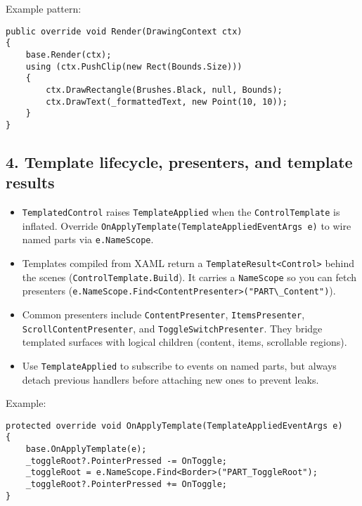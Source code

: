 Example pattern:

\begin{lstlisting}
public override void Render(DrawingContext ctx)
{
    base.Render(ctx);
    using (ctx.PushClip(new Rect(Bounds.Size)))
    {
        ctx.DrawRectangle(Brushes.Black, null, Bounds);
        ctx.DrawText(_formattedText, new Point(10, 10));
    }
}
\end{lstlisting}

\subsection{4. Template lifecycle, presenters, and template
results}\label{template-lifecycle-presenters-and-template-results}

\begin{itemize}
\tightlist
\item
  \passthrough{\lstinline!TemplatedControl!} raises
  \passthrough{\lstinline!TemplateApplied!} when the
  \passthrough{\lstinline!ControlTemplate!} is inflated. Override
  \passthrough{\lstinline!OnApplyTemplate(TemplateAppliedEventArgs e)!}
  to wire named parts via \passthrough{\lstinline!e.NameScope!}.
\item
  Templates compiled from XAML return a
  \passthrough{\lstinline!TemplateResult<Control>!} behind the scenes
  (\passthrough{\lstinline!ControlTemplate.Build!}). It carries a
  \passthrough{\lstinline!NameScope!} so you can fetch presenters
  (\passthrough{\lstinline!e.NameScope.Find<ContentPresenter>("PART\_Content")!}).
\item
  Common presenters include \passthrough{\lstinline!ContentPresenter!},
  \passthrough{\lstinline!ItemsPresenter!},
  \passthrough{\lstinline!ScrollContentPresenter!}, and
  \passthrough{\lstinline!ToggleSwitchPresenter!}. They bridge templated
  surfaces with logical children (content, items, scrollable regions).
\item
  Use \passthrough{\lstinline!TemplateApplied!} to subscribe to events
  on named parts, but always detach previous handlers before attaching
  new ones to prevent leaks.
\end{itemize}

Example:

\begin{lstlisting}
protected override void OnApplyTemplate(TemplateAppliedEventArgs e)
{
    base.OnApplyTemplate(e);
    _toggleRoot?.PointerPressed -= OnToggle;
    _toggleRoot = e.NameScope.Find<Border>("PART_ToggleRoot");
    _toggleRoot?.PointerPressed += OnToggle;
}
\end{lstlisting}

